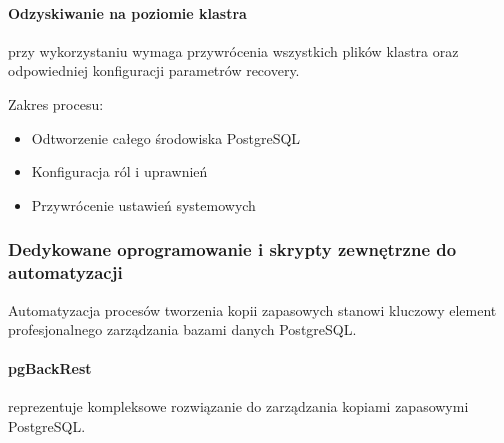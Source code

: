 \documentclass[letterpaper,10pt,polish]{sphinxmanual}
\begin{document}
\paragraph{Odzyskiwanie na poziomie klastra}
\label{\detokenize{rozdzial2/Kopie_zapasowe_i_odzyskiwanie_danych/kopie_zapasowe_i_odzyskiwanie_danych:odzyskiwanie-na-poziomie-klastra}}
\sphinxAtStartPar
{} przy wykorzystaniu  wymaga przywrócenia wszystkich plików klastra oraz odpowiedniej konfiguracji parametrów recovery.

\sphinxAtStartPar
Zakres procesu:
\begin{itemize}
\item {} 
\sphinxAtStartPar
Odtworzenie całego środowiska PostgreSQL

\item {} 
\sphinxAtStartPar
Konfiguracja ról i uprawnień

\item {} 
\sphinxAtStartPar
Przywrócenie ustawień systemowych

\end{itemize}


\subsubsection{Dedykowane oprogramowanie i skrypty zewnętrzne do automatyzacji}
\label{\detokenize{rozdzial2/Kopie_zapasowe_i_odzyskiwanie_danych/kopie_zapasowe_i_odzyskiwanie_danych:dedykowane-oprogramowanie-i-skrypty-zewnetrzne-do-automatyzacji}}
\sphinxAtStartPar
Automatyzacja procesów tworzenia kopii zapasowych stanowi kluczowy element profesjonalnego zarządzania bazami danych PostgreSQL.


\paragraph{pgBackRest}
\label{\detokenize{rozdzial2/Kopie_zapasowe_i_odzyskiwanie_danych/kopie_zapasowe_i_odzyskiwanie_danych:pgbackrest}}
\sphinxAtStartPar
{} reprezentuje kompleksowe rozwiązanie do zarządzania kopiami zapasowymi PostgreSQL.
\end{document}
